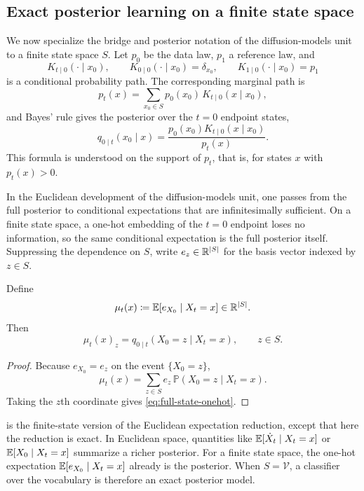 \documentclass[11pt]{article}
\begin{document}
\subsection{Exact posterior learning on a finite state space}
\label{subsec:finite-state-full-posterior}

We now specialize the bridge and posterior notation of the diffusion-models unit to a finite state space \(S\).
Let \(p_0\) be the data law, \(p_1\) a reference law, and
\[
  K_{t\mid 0}(\cdot\mid x_0),
  \qquad
  K_{0\mid 0}(\cdot\mid x_0)=\delta_{x_0},
  \qquad
  K_{1\mid 0}(\cdot\mid x_0)=p_1
\]
is a conditional probability path.
The corresponding marginal path is
\[
  p_t(x)=\sum_{x_0\in S} p_0(x_0)\,K_{t\mid 0}(x\mid x_0),
\]
and Bayes' rule gives the posterior over the \(t=0\) endpoint states,
\[
  q_{0\mid t}(x_0\mid x)
  =
  \frac{p_0(x_0)K_{t\mid 0}(x\mid x_0)}{p_t(x)}.
\]
This formula is understood on the support of \(p_t\), that is, for states \(x\) with \(p_t(x)>0\).

In the Euclidean development of the diffusion-models unit, one passes from the full posterior to conditional expectations that are infinitesimally sufficient.
On a finite state space, a one-hot embedding of the \(t=0\) endpoint loses no information, so the same conditional expectation is the full posterior itself.
Suppressing the dependence on \(S\), write \(e_z\in\mathbb{R}^{|S|}\) for the basis vector indexed by \(z\in S\).

\begin{proposition}
\label{prop:full-state-onehot}
Define
\[
  \mu_t(x)\coloneqq \mathbb{E}[e_{X_0}\mid X_t=x]\in\mathbb{R}^{|S|}.
\]
Then
\begin{equation}
  \mu_t(x)_z
  =
  q_{0\mid t}(X_0=z\mid X_t=x),
  \qquad z\in S.
  \label{eq:full-state-onehot}
\end{equation}
\end{proposition}
\begin{proof}
Because \(e_{X_0}=e_z\) on the event \(\{X_0=z\}\),
\[
  \mu_t(x)
  =
  \sum_{z\in S} e_z\,\mathbb{P}(X_0=z\mid X_t=x).
\]
Taking the \(z\)th coordinate gives \eqref{eq:full-state-onehot}.%
\end{proof}

 is the finite-state version of the Euclidean expectation reduction, except that here the reduction is exact.
In Euclidean space, quantities like \(\mathbb{E}[\dot X_t\mid X_t=x]\) or \(\mathbb{E}[X_0\mid X_t=x]\) summarize a richer posterior.
For a finite state space, the one-hot expectation \(\mathbb{E}[e_{X_0}\mid X_t=x]\) already is the posterior.
When \(S=\mathcal{V}\), a classifier over the vocabulary is therefore an exact posterior model.
\end{document}
